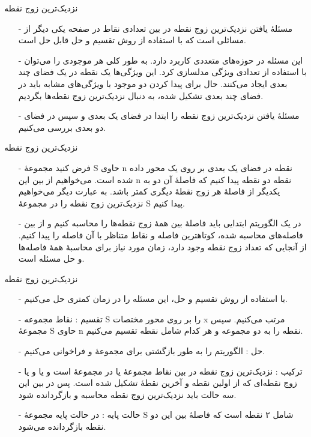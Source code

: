 
\begin{frame}{‌نزدیک‌ترین زوج نقطه}
\begin{itemize}\itemr
\item[-]
مسئلهٔ یافتن نزدیک‌ترین زوج نقطه
در بین تعدادی نقاط در صفحه یکی دیگر از مسائلی است که با استفاده از روش تقسیم و حل قابل حل است.
\item[-]
این مسئله در حوزه‌های متعددی کاربرد دارد. به طور کلی هر موجودی را می‌توان با استفاده از تعدادی ویژگی مدلسازی کرد. این ویژگی‌ها یک نقطه در یک فضای چند بعدی ایجاد می‌کنند. حال برای پیدا کردن دو موجود با ویژگی‌های مشابه باید در فضای چند بعدی تشکیل شده، به دنبال نزدیک‌ترین زوج نقطه‌ها بگردیم.
\item[-]
مسئلهٔ یافتن نزدیک‌ترین زوج نقطه را ابتدا در فضای یک بعدی و سپس در فضای دو بعدی بررسی می‌کنیم.
\end{itemize}
\end{frame}


\begin{frame}{‌نزدیک‌ترین زوج نقطه}
\begin{itemize}\itemr
\item[-]
فرض کنید مجموعهٔ S حاوی n نقطه در فضای یک بعدی بر روی یک محور داده شده است. می‌خواهیم از بین این n نقطه دو نقطه پیدا کنیم که فاصلهٔ آن دو به یکدیگر از فاصلهٔ هر زوج نقطهٔ دیگری کمتر باشد. به عبارت دیگر می‌خواهیم نزدیک‌ترین زوج نقطه را در مجموعهٔ S پیدا کنیم.
\item[-]
در یک الگوریتم ابتدایی باید فاصلهٔ بین همهٔ زوج نقطه‌ها را محاسبه کنیم و از بین فاصله‌های محاسبه شده، کوتاهترین فاصله و نقاط متناظر با آن فاصله‌ را پیدا کنیم. از آنجایی که تعداد
زوج نقطه وجود دارد، زمان مورد نیاز برای محاسبهٔ همهٔ فاصله‌ها و حل مسئله
است.
\end{itemize}
\end{frame}


\begin{frame}{‌نزدیک‌ترین زوج نقطه}
\begin{itemize}\itemr
\item[-]
با استفاده از روش تقسیم و حل، این مسئله را در زمان کمتری حل می‌کنیم.
\item[-]
تقسیم : نقاط مجموعه S را بر روی محور مختصات x مرتب می‌کنیم. سپس مجموعهٔ S حاوی n نقطه را به دو مجموعه
و
هر کدام شامل
نقطه تقسیم می‌کنیم.
\item[-]
حل : الگوریتم را به طور بازگشتی برای مجموعهٔ
و
فراخوانی می‌کنیم.
\item[-]
ترکیب : نزدیک‌ترین زوج نقطه در بین نقاط مجموعهٔ
یا
در مجموعهٔ
است و یا
و یا زوج نقطه‌ای که از اولین نقطه
و آخرین نقطهٔ
تشکیل شده است. پس در بین این سه حالت باید نزدیک‌ترین زوج نقطه محاسبه و بازگردانده شود.
\item[-]
حالت پایه : در حالت پایه مجموعهٔ S شامل ۲ نقطه است که فاصلهٔ بین این دو نقطه بازگردانده می‌شود.
\end{itemize}
\end{frame}


